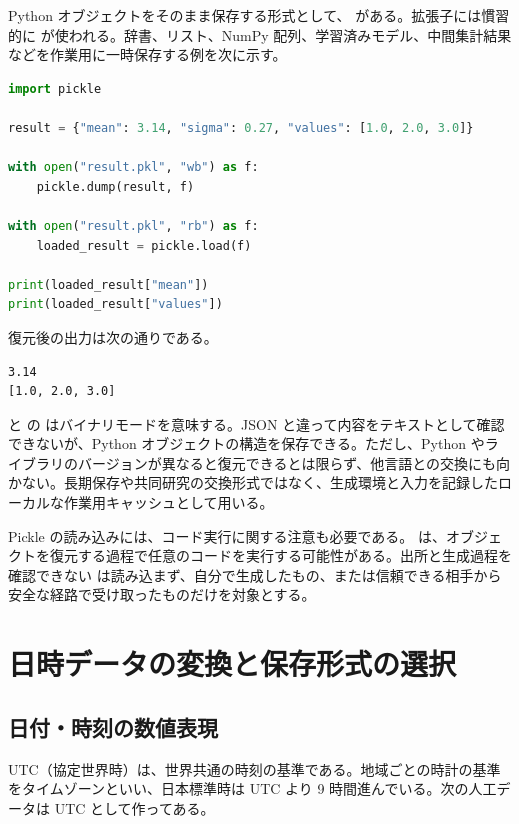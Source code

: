 Python オブジェクトをそのまま保存する形式として、 がある。拡張子には慣習的に  が使われる。辞書、リスト、NumPy 配列、学習済みモデル、中間集計結果などを作業用に一時保存する例を次に示す。

\begin{lstlisting}[language=Python]
import pickle

result = {"mean": 3.14, "sigma": 0.27, "values": [1.0, 2.0, 3.0]}

with open("result.pkl", "wb") as f:
    pickle.dump(result, f)

with open("result.pkl", "rb") as f:
    loaded_result = pickle.load(f)

print(loaded_result["mean"])
print(loaded_result["values"])
\end{lstlisting}

復元後の出力は次の通りである。

\begin{lstlisting}[numbers=none, xleftmargin=2\zw]
3.14
[1.0, 2.0, 3.0]
\end{lstlisting}

 と  の  はバイナリモードを意味する。JSON と違って内容をテキストとして確認できないが、Python オブジェクトの構造を保存できる。ただし、Python やライブラリのバージョンが異なると復元できるとは限らず、他言語との交換にも向かない。長期保存や共同研究の交換形式ではなく、生成環境と入力を記録したローカルな作業用キャッシュとして用いる。

Pickle の読み込みには、コード実行に関する注意も必要である。 は、オブジェクトを復元する過程で任意のコードを実行する可能性がある。出所と生成過程を確認できない  は読み込まず、自分で生成したもの、または信頼できる相手から安全な経路で受け取ったものだけを対象とする。

\section{日時データの変換と保存形式の選択}

\subsection{日付・時刻の数値表現}

UTC（協定世界時）は、世界共通の時刻の基準である。地域ごとの時計の基準をタイムゾーンといい、日本標準時は UTC より 9 時間進んでいる。次の人工データは UTC として作ってある。

